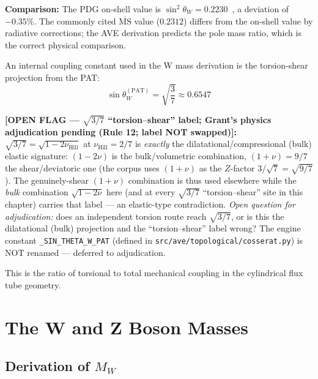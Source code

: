 \noindent\textbf{Comparison:} The PDG on-shell value is $\sin^2\theta_W = 0.2230$~\cite{pdg2022}, a deviation of $-0.35\%$. The commonly cited $\overline{\text{MS}}$ value ($0.2312$) differs from the on-shell value by radiative corrections; the AVE derivation predicts the pole mass ratio, which is the correct physical comparison.

An internal coupling constant used in the W mass derivation is the torsion-shear projection from the PAT:
\begin{equation}
    \sin\theta_W^{(\text{PAT})} = \sqrt{\frac{3}{7}} \approx 0.6547
\end{equation}

\noindent\textbf{[OPEN FLAG --- $\sqrt{3/7}$ ``torsion--shear'' label; Grant's physics adjudication pending (Rule 12; label NOT swapped)]:} $\sqrt{3/7} = \sqrt{1 - 2\nu_{\text{Hill}}}$ at $\nu_{\text{Hill}} = 2/7$ is \emph{exactly} the dilatational/compressional (bulk) elastic signature: $(1-2\nu)$ is the bulk/volumetric combination, $(1+\nu) = 9/7$ the shear/deviatoric one (the corpus uses $(1+\nu)$ as the $Z$-factor $3/\sqrt{7} = \sqrt{9/7}$). The genuinely-shear $(1+\nu)$ combination is thus used elsewhere while the \emph{bulk} combination $\sqrt{1-2\nu}$ here (and at every $\sqrt{3/7}$ ``torsion--shear'' site in this chapter) carries that label --- an elastic-type contradiction. \emph{Open question for adjudication:} does an independent torsion route reach $\sqrt{3/7}$, or is this the dilatational (bulk) projection and the ``torsion--shear'' label wrong? The engine constant \texttt{\_SIN\_THETA\_W\_PAT} (defined in \texttt{src/ave/topological/cosserat.py}) is NOT renamed --- deferred to adjudication.

This is the ratio of torsional to total mechanical coupling in the cylindrical flux tube geometry.

\section{The W and Z Boson Masses}

\subsection{Derivation of $M_W$}

